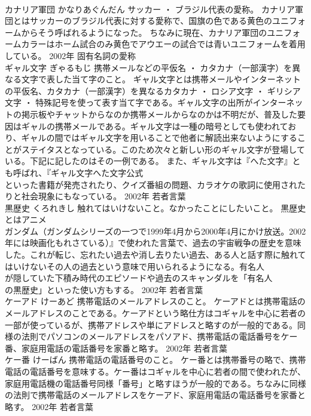 \documentclass[8pt]{extreport}
\begin{document}
\begin{CJK}{UTF8}{min}
\\	カナリア軍団	かなりあぐんだん	サッカー ・ ブラジル代表の愛称。	カナリア軍団とはサッカーのブラジル代表に対する愛称で、国旗の色である黄色のユニフォームからそう呼ばれるようになった。 ちなみに現在、カナリア軍団のユニフォームカラーはホーム試合のみ黄色でアウエーの試合では青いユニフォームを着用している。	2002年	固有名詞の愛称	
\\	ギャル文字	ぎゃるもじ	携帯メールなどの平仮名 ・ カタカナ（一部漢字）を異なる文字で表した当て字のこと。	ギャル文字とは携帯メールやインターネットの平仮名、カタカナ（一部漢字）を異なるカタカナ ・ ロシア文字 ・ ギリシア文字 ・ 特殊記号を使って表す当て字である。ギャル文字の出所がインターネットの掲示板やチャットからなのか携帯メールからなのかは不明だが、普及した要因はギャルの携帯メールである。ギャル文字は一種の暗号としても使われており、ギャルの間ではギャル文字を用いることで他者に解読出来ないようにすることがステイタスとなっている。このため次々と新しい形のギャル文字が登場している。下記に記したのはその一例である。 また、ギャル文字は『へた文字』とも呼ばれ、『ギャル文字へた文字公式
\\	といった書籍が発売されたり、クイズ番組の問題、カラオケの歌詞に使用されたりと社会現象にもなっている。	2002年	若者言葉	
\\	黒歴史	くろれきし	触れてはいけないこと。なかったことにしたいこと。	黒歴史とはアニメ
\\	ガンダム（ガンダムシリーズの一つで1999年4月から2000年4月にかけ放送。2002年には映画化もれさている）』で使われた言葉で、過去の宇宙戦争の歴史を意味した。これが転じ、忘れたい過去や消し去りたい過去、ある人と話す際に触れてはいけないその人の過去という意味で用いられるようになる。有名人
\\	が隠していた下積み時代のエピソードや過去のスキャンダルを「有名人
\\	の黒歴史」といった使い方もする。	2002年	若者言葉	
\\	ケーアド	けーあど	携帯電話のメールアドレスのこと。	ケーアドとは携帯電話のメールアドレスのことである。ケーアドという略仕方はコギャルを中心に若者の一部が使っているが、携帯アドレスや単にアドレスと略すのが一般的である。同様の法則でパソコンのメールアドレスをパソアド、携帯電話の電話番号をケー番、家庭用電話の電話番号を家番と略す。	2002年	若者言葉	
\\	ケー番	けーばん	携帯電話の電話番号のこと。	ケー番とは携帯番号の略で、携帯電話の電話番号を意味する。ケー番はコギャルを中心に若者の間で使われたが、家庭用電話機の電話番号同様「番号」と略すほうが一般的である。ちなみに同様の法則で携帯電話のメールアドレスをケーアド、家庭用電話の電話番号を家番と略す。	2002年	若者言葉	

\end{CJK}
\end{document}
